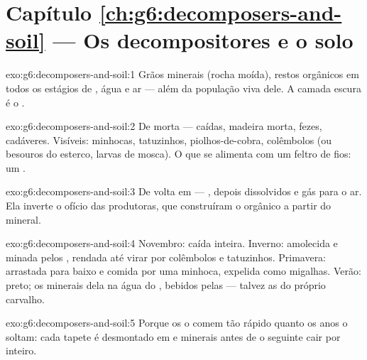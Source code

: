 \section*{Capítulo \ref{ch:g6:decomposers-and-soil} --- Os decompositores e o solo}

\begin{solution}{exo:g6:decomposers-and-soil:1}
Grãos minerais (rocha moída), restos orgânicos em todos os estágios
de , água e ar --- além da população viva dele. A camada
escura é o .
\end{solution}

\begin{solution}{exo:g6:decomposers-and-soil:2}
De  morta ---  caídas, madeira morta, fezes,
cadáveres. Visíveis: minhocas, tatuzinhos, piolhos-de-cobra,
colêmbolos (ou besouros do esterco, larvas de mosca). O que se
alimenta com um feltro de fios: um .
\end{solution}

\begin{solution}{exo:g6:decomposers-and-soil:3}
De volta em  --- , depois 
dissolvidos e gás para o ar. Ela inverte o ofício das produtoras, que
construíram o orgânico a partir do mineral.
\end{solution}

\begin{solution}{exo:g6:decomposers-and-soil:4}
Novembro: caída inteira. Inverno: amolecida e minada pelos ,
rendada até virar  por colêmbolos e tatuzinhos. Primavera:
arrastada para baixo e comida por uma minhoca, expelida como
migalhas. Verão:  preto; os minerais dela na água do ,
bebidos pelas  --- talvez as do próprio carvalho.
\end{solution}

\begin{solution}{exo:g6:decomposers-and-soil:5}
Porque os  o comem tão rápido quanto os anos o soltam:
cada tapete é desmontado em  e minerais antes de o seguinte cair
por inteiro.
\end{solution}

